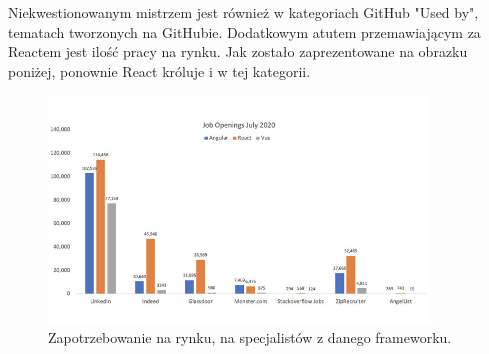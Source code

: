 \documentclass[12pt]{article}
\begin{document}
\begin{sloppypar}
{{    Niekwestionowanym mistrzem jest również w kategoriach GitHub "Used by", tematach tworzonych na GitHubie.\cite{frontend-popularity} Dodatkowym atutem przemawiającym za Reactem jest 
    ilość pracy na rynku. Jak zostało zaprezentowane na obrazku poniżej, ponownie React króluje i w tej kategorii. 
    \begin{figure}[H]
      \centering
      \includegraphics[width=0.9\textwidth]{frontend_jobs.jpg}
      \caption{Zapotrzebowanie na rynku, na specjalistów z danego frameworku.\cite{accenture}}
      \label{fig:frontend-jobs}
    \end{figure}
  }
}
\end{sloppypar}
\end{document}
